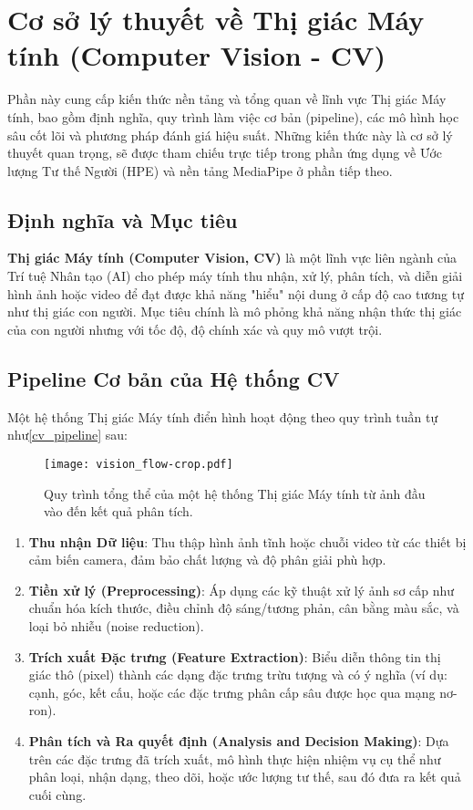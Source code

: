\section{Cơ sở lý thuyết về Thị giác Máy tính (Computer Vision - CV)}

Phần này cung cấp kiến thức nền tảng và tổng quan về lĩnh vực Thị giác Máy tính, bao gồm định nghĩa, quy trình làm việc cơ bản (pipeline), các mô hình học sâu cốt lõi và phương pháp đánh giá hiệu suất. Những kiến thức này là cơ sở lý thuyết quan trọng, sẽ được tham chiếu trực tiếp trong phần ứng dụng về Ước lượng Tư thế Người (HPE) và nền tảng MediaPipe ở phần tiếp theo.

\subsection{Định nghĩa và Mục tiêu}
\textbf{Thị giác Máy tính (Computer Vision, CV)} là một lĩnh vực liên ngành của Trí tuệ Nhân tạo (AI) cho phép máy tính thu nhận, xử lý, phân tích, và diễn giải hình ảnh hoặc video để đạt được khả năng "hiểu" nội dung ở cấp độ cao tương tự như thị giác con người. Mục tiêu chính là mô phỏng khả năng nhận thức thị giác của con người nhưng với tốc độ, độ chính xác và quy mô vượt trội.

\subsection{Pipeline Cơ bản của Hệ thống CV}
Một hệ thống Thị giác Máy tính điển hình hoạt động theo quy trình tuần tự như\ref{cv_pipeline} sau:


\begin{figure}[h]
    \centering
    \texttt{[image: vision\_flow-crop.pdf]}
    \caption{Quy trình tổng thể của một hệ thống Thị giác Máy tính từ ảnh đầu vào đến kết quả phân tích.}
    \label{fig:cv_pipeline}
\end{figure}

\begin{enumerate}
    \item \textbf{Thu nhận Dữ liệu}: Thu thập hình ảnh tĩnh hoặc chuỗi video từ các thiết bị cảm biến camera, đảm bảo chất lượng và độ phân giải phù hợp.
    \item \textbf{Tiền xử lý (Preprocessing)}: Áp dụng các kỹ thuật xử lý ảnh sơ cấp như chuẩn hóa kích thước, điều chỉnh độ sáng/tương phản, cân bằng màu sắc, và loại bỏ nhiễu (noise reduction).
    \item \textbf{Trích xuất Đặc trưng (Feature Extraction)}: Biểu diễn thông tin thị giác thô (pixel) thành các dạng đặc trưng trừu tượng và có ý nghĩa (ví dụ: cạnh, góc, kết cấu, hoặc các đặc trưng phân cấp sâu được học qua mạng nơ-ron).
    \item \textbf{Phân tích và Ra quyết định (Analysis and Decision Making)}: Dựa trên các đặc trưng đã trích xuất, mô hình thực hiện nhiệm vụ cụ thể như phân loại, nhận dạng, theo dõi, hoặc ước lượng tư thế, sau đó đưa ra kết quả cuối cùng.
\end{enumerate}

